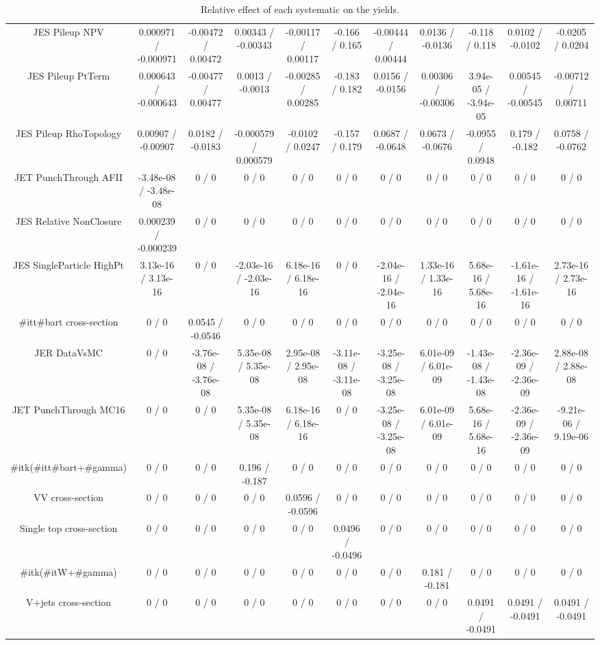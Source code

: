 \begin{table}[htbp]
\begin{center}
\begin{tabular}{|c|c|c|c|c|c|c|c|c|c|c|}
  JES Pileup NPV & 0.000971 / -0.000971 & -0.00472 / 0.00472 & 0.00343 / -0.00343 & -0.00117 / 0.00117 & -0.166 / 0.165 & -0.00444 / 0.00444 & 0.0136 / -0.0136 & -0.118 / 0.118 & 0.0102 / -0.0102 & -0.0205 / 0.0204 \\ 
  JES Pileup PtTerm & 0.000643 / -0.000643 & -0.00477 / 0.00477 & 0.0013 / -0.0013 & -0.00285 / 0.00285 & -0.183 / 0.182 & 0.0156 / -0.0156 & 0.00306 / -0.00306 & 3.94e-05 / -3.94e-05 & 0.00545 / -0.00545 & -0.00712 / 0.00711 \\ 
  JES Pileup RhoTopology & 0.00907 / -0.00907 & 0.0182 / -0.0183 & -0.000579 / 0.000579 & -0.0102 / 0.0247 & -0.157 / 0.179 & 0.0687 / -0.0648 & 0.0673 / -0.0676 & -0.0955 / 0.0948 & 0.179 / -0.182 & 0.0758 / -0.0762 \\ 
  JET PunchThrough AFII & -3.48e-08 / -3.48e-08 & 0 / 0 & 0 / 0 & 0 / 0 & 0 / 0 & 0 / 0 & 0 / 0 & 0 / 0 & 0 / 0 & 0 / 0 \\ 
  JES Relative NonClosure & 0.000239 / -0.000239 & 0 / 0 & 0 / 0 & 0 / 0 & 0 / 0 & 0 / 0 & 0 / 0 & 0 / 0 & 0 / 0 & 0 / 0 \\ 
  JES SingleParticle HighPt & 3.13e-16 / 3.13e-16 & 0 / 0 & -2.03e-16 / -2.03e-16 & 6.18e-16 / 6.18e-16 & 0 / 0 & -2.04e-16 / -2.04e-16 & 1.33e-16 / 1.33e-16 & 5.68e-16 / 5.68e-16 & -1.61e-16 / -1.61e-16 & 2.73e-16 / 2.73e-16 \\ 
  #it{t#bar{t}} cross-section & 0 / 0 & 0.0545 / -0.0546 & 0 / 0 & 0 / 0 & 0 / 0 & 0 / 0 & 0 / 0 & 0 / 0 & 0 / 0 & 0 / 0 \\ 
  JER DataVsMC & 0 / 0 & -3.76e-08 / -3.76e-08 & 5.35e-08 / 5.35e-08 & 2.95e-08 / 2.95e-08 & -3.11e-08 / -3.11e-08 & -3.25e-08 / -3.25e-08 & 6.01e-09 / 6.01e-09 & -1.43e-08 / -1.43e-08 & -2.36e-09 / -2.36e-09 & 2.88e-08 / 2.88e-08 \\ 
  JET PunchThrough MC16 & 0 / 0 & 0 / 0 & 5.35e-08 / 5.35e-08 & 6.18e-16 / 6.18e-16 & 0 / 0 & -3.25e-08 / -3.25e-08 & 6.01e-09 / 6.01e-09 & 5.68e-16 / 5.68e-16 & -2.36e-09 / -2.36e-09 & -9.21e-06 / 9.19e-06 \\ 
  #it{k}(#it{t#bar{t}+#gamma}) & 0 / 0 & 0 / 0 & 0.196 / -0.187 & 0 / 0 & 0 / 0 & 0 / 0 & 0 / 0 & 0 / 0 & 0 / 0 & 0 / 0 \\ 
  VV cross-section & 0 / 0 & 0 / 0 & 0 / 0 & 0.0596 / -0.0596 & 0 / 0 & 0 / 0 & 0 / 0 & 0 / 0 & 0 / 0 & 0 / 0 \\ 
  Single top cross-section & 0 / 0 & 0 / 0 & 0 / 0 & 0 / 0 & 0.0496 / -0.0496 & 0 / 0 & 0 / 0 & 0 / 0 & 0 / 0 & 0 / 0 \\ 
  #it{k}(#it{W+#gamma}) & 0 / 0 & 0 / 0 & 0 / 0 & 0 / 0 & 0 / 0 & 0 / 0 & 0.181 / -0.181 & 0 / 0 & 0 / 0 & 0 / 0 \\ 
  V+jets cross-section & 0 / 0 & 0 / 0 & 0 / 0 & 0 / 0 & 0 / 0 & 0 / 0 & 0 / 0 & 0.0491 / -0.0491 & 0.0491 / -0.0491 & 0.0491 / -0.0491 \\ 
\hline 
\end{tabular} 
\caption{Relative effect of each systematic on the yields.} 
\end{center} 
\end{table} 
